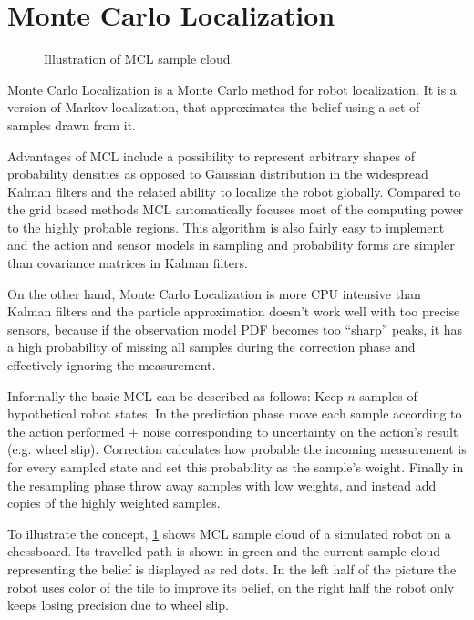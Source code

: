 \section{Monte Carlo Localization}
\label{sec:mcl-algorithm}

\begin{figure}[tp]
	\centering
	
	\caption{Illustration of MCL sample cloud.}
	\label{fig:mcl}
\end{figure}

Monte Carlo Localization \cite{dellaert99} is a Monte Carlo method for
robot localization.
It is a version of Markov localization, that approximates the belief
using a set of samples drawn from it.

Advantages of MCL include a
possibility to represent arbitrary shapes of probability densities as opposed to
Gaussian distribution in the widespread Kalman filters
and the related ability to localize the robot globally.
Compared to the grid based methods MCL automatically focuses most of the
computing power to the highly probable regions.
This algorithm is also fairly easy to implement and the action and sensor models
in sampling and probability forms are simpler than covariance matrices in
Kalman filters.

On the other hand, Monte Carlo Localization is more CPU intensive than Kalman filters
and the particle approximation doesn't work well with too precise sensors,
because if the observation model PDF becomes too \enquote{sharp} peaks, it has a high probability
of missing all samples during the correction phase and effectively ignoring the measurement.

Informally the basic MCL can be described as follows:
Keep \(n\) samples of hypothetical robot states.
In the prediction phase move each sample according to the action performed + noise corresponding
to uncertainty on the action's result (e.g. wheel slip).
Correction calculates how probable the incoming measurement is
for every sampled state and set this probability as the sample's weight.
Finally in the resampling phase throw away samples with low weights, and
instead add copies of the highly weighted samples.

To illustrate the concept, \cref{fig:mcl} shows MCL sample cloud of a simulated robot on a chessboard.
Its travelled path is shown in green and the current sample cloud representing
the belief is displayed as red dots.
In the left half of the picture the robot uses color of the tile to improve its
belief, on the right half the robot only keeps losing precision due to wheel slip.

